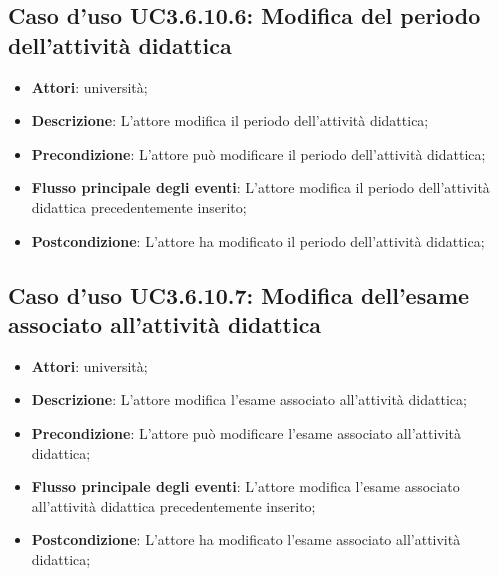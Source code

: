 \subsection{Caso d'uso \texorpdfstring{UC3.6.10.6}{UC3.6.10.6}: Modifica del periodo dell’attività didattica}
\begin{itemize}
\item \textbf{Attori}: università;
\item \textbf{Descrizione}: L'attore modifica il periodo dell’attività didattica;

\item \textbf{Precondizione}: L'attore può modificare il periodo dell’attività didattica;

\item \textbf{Flusso principale degli eventi}: L'attore modifica il periodo dell’attività didattica precedentemente inserito;

\item \textbf{Postcondizione}: L'attore ha modificato il periodo dell’attività didattica;

\end{itemize}
\subsection{Caso d'uso \texorpdfstring{UC3.6.10.7}{UC3.6.10.7}: Modifica dell’esame associato all’attività didattica}
\begin{itemize}
\item \textbf{Attori}: università;
\item \textbf{Descrizione}: L'attore modifica l’esame associato all’attività didattica;

\item \textbf{Precondizione}: L'attore può modificare l’esame associato all’attività didattica;

\item \textbf{Flusso principale degli eventi}: L'attore modifica l’esame associato all’attività didattica precedentemente inserito;

\item \textbf{Postcondizione}: L'attore ha modificato l’esame associato all’attività didattica;

\end{itemize}
